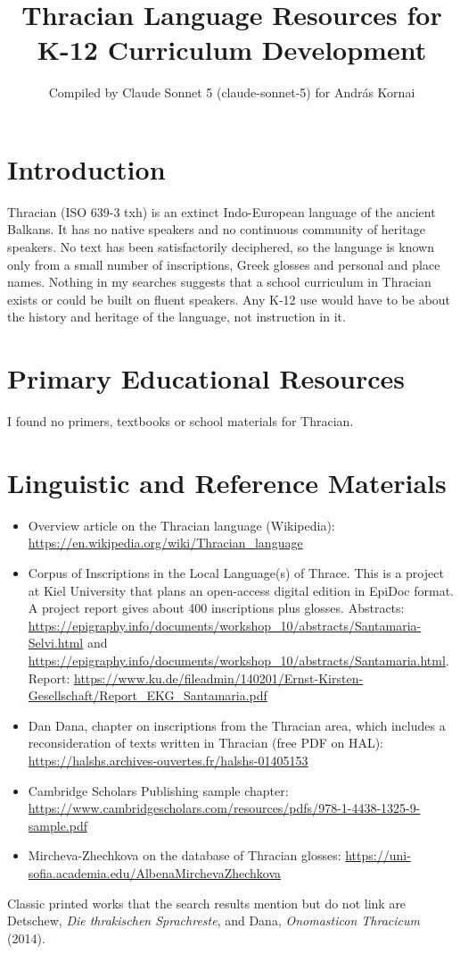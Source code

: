 \documentclass[12pt]{article}
\title{Thracian Language Resources for K-12 Curriculum Development}
\author{Compiled by Claude Sonnet 5 (claude-sonnet-5) for Andr\'as Kornai}
\date{}
\begin{document}
\maketitle

\section{Introduction}
Thracian (ISO 639-3 txh) is an extinct Indo-European language of the ancient Balkans. It has no native speakers and no continuous community of heritage speakers. No text has been satisfactorily deciphered, so the language is known only from a small number of inscriptions, Greek glosses and personal and place names. Nothing in my searches suggests that a school curriculum in Thracian exists or could be built on fluent speakers. Any K-12 use would have to be about the history and heritage of the language, not instruction in it.

\section{Primary Educational Resources}
I found no primers, textbooks or school materials for Thracian.

\section{Linguistic and Reference Materials}
\begin{itemize}
\item Overview article on the Thracian language (Wikipedia): \url{https://en.wikipedia.org/wiki/Thracian_language}
\item Corpus of Inscriptions in the Local Language(s) of Thrace. This is a project at Kiel University that plans an open-access digital edition in EpiDoc format. A project report gives about 400 inscriptions plus glosses. Abstracts: \url{https://epigraphy.info/documents/workshop_10/abstracts/Santamaria-Selvi.html} and \url{https://epigraphy.info/documents/workshop_10/abstracts/Santamaria.html}. Report: \url{https://www.ku.de/fileadmin/140201/Ernst-Kirsten-Gesellschaft/Report_EKG_Santamaria.pdf}
\item Dan Dana, chapter on inscriptions from the Thracian area, which includes a reconsideration of texts written in Thracian (free PDF on HAL): \url{https://halshs.archives-ouvertes.fr/halshs-01405153}
\item Cambridge Scholars Publishing sample chapter: \url{https://www.cambridgescholars.com/resources/pdfs/978-1-4438-1325-9-sample.pdf}
\item Mircheva-Zhechkova on the database of Thracian glosses: \url{https://uni-sofia.academia.edu/AlbenaMirchevaZhechkova}
\end{itemize}
Classic printed works that the search results mention but do not link are Detschew, \emph{Die thrakischen Sprachreste}, and Dana, \emph{Onomasticon Thracicum} (2014).
\end{document}
